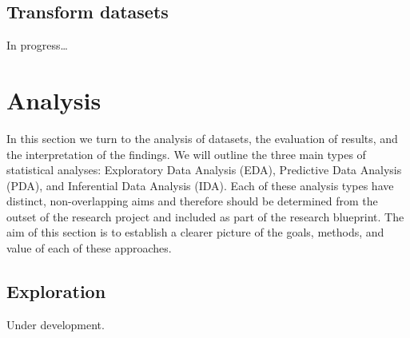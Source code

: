 \documentclass[
  letterpaper,
  DIV=11,
  numbers=noendperiod]{scrreport}
\theoremstyle{definition}
\theoremstyle{remark}
\begin{document}
\hypertarget{sec-transform-datasets}{%
\chapter{Transform datasets}\label{sec-transform-datasets}}

\begin{tcolorbox}[enhanced jigsaw, title=\textcolor{quarto-callout-caution-color}{\faFire}\hspace{0.5em}{Caution}, left=2mm, breakable, toptitle=1mm, colback=white, leftrule=.75mm, toprule=.15mm, coltitle=black, colframe=quarto-callout-caution-color-frame, colbacktitle=quarto-callout-caution-color!10!white, bottomtitle=1mm, opacityback=0, titlerule=0mm, rightrule=.15mm, opacitybacktitle=0.6, bottomrule=.15mm, arc=.35mm]

 In progress\ldots{}

\end{tcolorbox}

\part{Analysis}

In this section we turn to the analysis of datasets, the evaluation of
results, and the interpretation of the findings. We will outline the
three main types of statistical analyses: Exploratory Data Analysis
(EDA), Predictive Data Analysis (PDA), and Inferential Data Analysis
(IDA). Each of these analysis types have distinct, non-overlapping aims
and therefore should be determined from the outset of the research
project and included as part of the research blueprint. The aim of this
section is to establish a clearer picture of the goals, methods, and
value of each of these approaches.

\hypertarget{sec-exploration}{%
\chapter{Exploration}\label{sec-exploration}}

\begin{tcolorbox}[enhanced jigsaw, title=\textcolor{quarto-callout-caution-color}{\faFire}\hspace{0.5em}{Caution}, left=2mm, breakable, toptitle=1mm, colback=white, leftrule=.75mm, toprule=.15mm, coltitle=black, colframe=quarto-callout-caution-color-frame, colbacktitle=quarto-callout-caution-color!10!white, bottomtitle=1mm, opacityback=0, titlerule=0mm, rightrule=.15mm, opacitybacktitle=0.6, bottomrule=.15mm, arc=.35mm]

Under development.

\end{tcolorbox}
\end{document}
